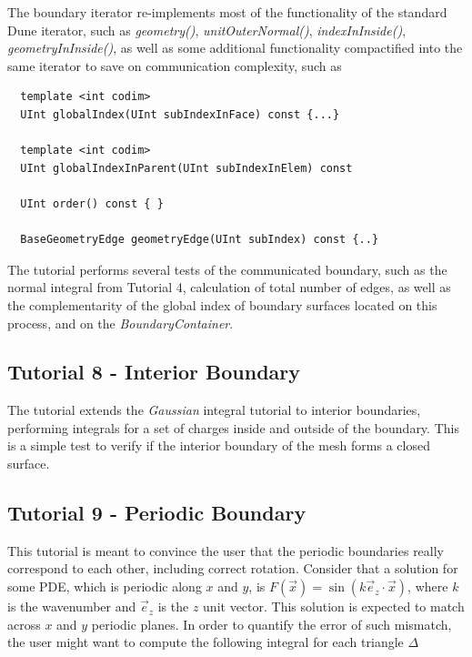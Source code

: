 \noindent
The boundary iterator re-implements most of the functionality of the standard Dune iterator, such as \textit{geometry()}, \textit{unitOuterNormal()}, \textit{indexInInside()}, \textit{geometryInInside()}, as well as some additional functionality compactified into the same iterator to save on communication complexity, such as 

\begin{mybox}
\begin{lstlisting}
  template <int codim>
  UInt globalIndex(UInt subIndexInFace) const {...}

  template <int codim>
  UInt globalIndexInParent(UInt subIndexInElem) const 

  UInt order() const { }

  BaseGeometryEdge geometryEdge(UInt subIndex) const {..}
\end{lstlisting}
\end{mybox}

\noindent
The tutorial performs several tests of the communicated boundary, such as the normal integral from Tutorial 4, calculation of total number of edges, as well as the complementarity of the global index of boundary surfaces located on this process, and on the \textit{BoundaryContainer}. \\




\subsection{Tutorial 8 - Interior Boundary}
\label{usage-howto-tutorial-interiorboundary}

The tutorial extends the \textit{Gaussian} integral tutorial to interior boundaries, performing integrals for a set of charges inside and outside of the boundary. This is a simple test to verify if the interior boundary of the mesh forms a closed surface.



\subsection{Tutorial 9 - Periodic Boundary}
\label{usage-howto-tutorial-periodic}

This tutorial is meant to convince the user that the periodic boundaries really correspond to each other, including correct rotation. Consider that a solution for some PDE, which is periodic along $x$ and $y$, is $F(\vec{x}) = \sin(k \vec{e}_z \cdot \vec{x})$, where $k$ is the wavenumber and $\vec{e}_z$ is the $z$ unit vector. This solution is expected to match across $x$ and $y$ periodic planes. In order to quantify the error of such mismatch, the user might want to compute the following integral for each triangle $\Delta$

